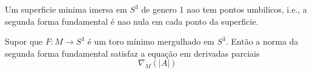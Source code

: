 \begin{proposicao}
	Um superficie minima imersa em $S^3$ de genero 1 nao tem pontos umbilicos, i.e., a segunda forma fundamental é nao nula em cada ponto da superficie.
\end{proposicao}

\begin{proposicao}
	Supor que $F: M \rightarrow S^3$ é um toro mínimo mergulhado em $S^3$. Então a norma da segunda forma fundamental satisfaz a equação em derivadas parciais
	\begin{equation*}
		\nabla_M (|A|)
	\end{equation*}
\end{proposicao}